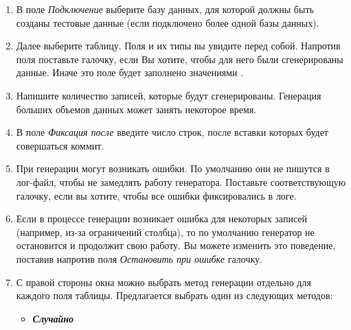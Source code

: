 \begin{enumerate}[leftmargin=39pt]
	\item В поле \textit{Подключение} выберите базу данных, для которой должны быть созданы тестовые данные (если подключено более одной базы данных). 

	\item Далее выберите таблицу. Поля и их типы вы увидите перед собой. Напротив поля поставьте галочку, если Вы хотите, чтобы для него были сгенерированы данные. Иначе это поле будет заполнено значениями .

	\item Напишите количество записей, которые будут сгенерированы. Генерация больших объемов данных может занять некоторое время. 
	
	\item В поле \textit{Фиксация после} введите число строк, после вставки которых будет совершаться коммит.
	
	\item При генерации могут возникать ошибки. По умолчанию они не пишутся в лог-файл, чтобы не замедлять работу генератора. Поставьте соответствующую галочку, если вы хотите, чтобы все ошибки фиксировались в логе.
	
	\item Если в процессе генерации возникает ошибка для некоторых записей (например, из-за ограничений столбца), то по умолчанию генератор не остановится и продолжит свою работу. Вы можете изменить это поведение, поставив напротив поля \textit{Остановить при ошибке} галочку.

	\item С правой стороны окна можно выбрать метод генерации отдельно для каждого поля таблицы. 
Предлагается выбрать один из следующих методов:
\begin{itemize}[leftmargin=10pt]
	\item \textbf{\textit{Случайно}}
	

\end{itemize}
\end{enumerate}
